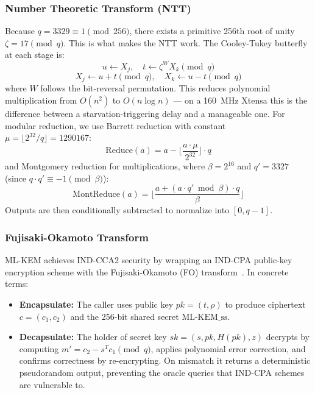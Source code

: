 \documentclass[journal, 10pt]{IEEEtran}
\begin{document}
\subsubsection{Number Theoretic Transform (NTT)}
Because $q = 3329 \equiv 1 \pmod{256}$, there exists a primitive 256th root of unity $\zeta = 17 \pmod{q}$. This is what makes the NTT work. The Cooley-Tukey butterfly at each stage is:
\begin{equation}
u \leftarrow X_j, \quad t \leftarrow \zeta^W X_k \pmod{q}
\end{equation}
\begin{equation}
X_j \leftarrow u + t \pmod{q}, \quad X_k \leftarrow u - t \pmod{q}
\end{equation}
where $W$ follows the bit-reversal permutation. This reduces polynomial multiplication from $O(n^2)$ to $O(n \log n)$ — on a 160~MHz Xtensa this is the difference between a starvation-triggering delay and a manageable one. For modular reduction, we use Barrett reduction with constant $\mu = \lfloor 2^{32}/q \rfloor = 1290167$:
\begin{equation}
\text{Reduce}(a) = a - \lfloor \frac{a \cdot \mu}{2^{32}} \rfloor \cdot q
\end{equation}
and Montgomery reduction for multiplications, where $\beta = 2^{16}$ and $q' = 3327$ (since $q \cdot q' \equiv -1 \pmod{\beta}$):
\begin{equation}
\text{MontReduce}(a) = \lfloor \frac{a + (a \cdot q' \bmod \beta) \cdot q}{\beta} \rfloor
\end{equation}
Outputs are then conditionally subtracted to normalize into $[0, q-1]$.

\subsubsection{Fujisaki-Okamoto Transform}
ML-KEM achieves IND-CCA2 security by wrapping an IND-CPA public-key encryption scheme with the Fujisaki-Okamoto (FO) transform~\cite{b4,b23}. In concrete terms:
\begin{itemize}
    \item \textbf{Encapsulate:} The caller uses public key $pk = (t, \rho)$ to produce ciphertext $c = (c_1, c_2)$ and the 256-bit shared secret $\text{ML-KEM\_ss}$.
    \item \textbf{Decapsulate:} The holder of secret key $sk = (s, pk, H(pk), z)$ decrypts by computing $m' = c_2 - s^T c_1 \pmod{q}$, applies polynomial error correction, and confirms correctness by re-encrypting. On mismatch it returns a deterministic pseudorandom output, preventing the oracle queries that IND-CPA schemes are vulnerable to.
\end{itemize}
\end{document}
